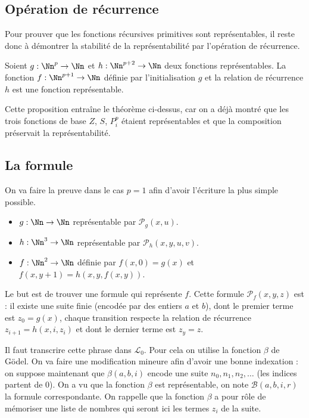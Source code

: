 \documentclass[11pt,class=report,crop=false]{standalone}
\begin{document}
\subsection{Opération de récurrence}

Pour prouver que les fonctions récursives primitives sont représentables, il reste donc à démontrer la stabilité de la représentabilité par l'opération de récurrence.

\begin{proposition}
    Soient $g : \Nn^p \to \Nn$ et $h : \Nn^{p+2} \to \Nn$ deux fonctions représentables. La fonction $f : \Nn^{p+1} \to \Nn$ définie par l'initialisation $g$ et la relation de récurrence $h$ est une fonction représentable.
\end{proposition}


Cette proposition entraîne le théorème ci-dessus, car on a déjà montré que les trois fonctions de base $Z$, $S$, $P_i^p$ étaient représentables et que la composition préservait la représentabilité.

\subsection{La formule}

On va faire la preuve dans le cas $p=1$ afin d'avoir l'écriture la plus simple possible.
\begin{itemize}
    \item $g : \Nn \to \Nn$ représentable par $\mathcal{P}_g(x,u)$.
    \item $h : \Nn^3 \to \Nn$ représentable par $\mathcal{P}_h(x,y,u,v)$.
    \item $f : \Nn^2 \to \Nn$ définie par $f(x,0) = g(x)$ et $f(x,y+1) = h(x,y,f(x,y))$.
\end{itemize}


Le but est de trouver une formule qui représente $f$. Cette formule $\mathcal{P}_f(x,y,z)$ est : \og{}il existe une suite finie (encodée par des entiers $a$ et $b$), dont le premier terme est $z_0 = g(x)$, chaque transition respecte la relation de récurrence $z_{i+1} = h(x,i,z_i)$ et dont le dernier terme est $z_y = z$\fg{}.

Il faut transcrire cette phrase dans $\mathcal{L}_0$. Pour cela on utilise la fonction $\beta$ de Gödel. On va faire une modification mineure afin d'avoir une bonne indexation : on suppose maintenant que $\beta(a,b,i)$ encode une suite $n_0, n_1, n_2, \dots$ (les indices partent de $0$). On a vu que la fonction $\beta$ est représentable, on note $\mathcal{B}(a,b,i,r)$ la formule correspondante.
On rappelle que la fonction $\beta$ a pour rôle de mémoriser une liste de nombres qui seront ici les termes $z_i$ de la suite.
\end{document}
